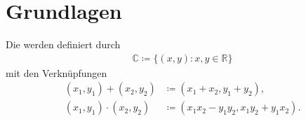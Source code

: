 %

\section{Grundlagen}
\addtocounter{thmn}{1}
\setcounter{theorem}{0}

\begin{theorem}[Definition]
  Die  werden definiert durch
  \begin{align*}
    \mathbb{C} \coloneq \{ (x,y) : x,y \in \mathbb{R} \}
  \end{align*}
  mit den Verknüpfungen
  \begin{align*}
    (x_1,y_1) + (x_2,y_2) &\coloneq (x_1 + x_2,y_1 + y_2), \\
    (x_1,y_1) \cdot (x_2,y_2) &\coloneq (x_1 x_2 - y_1 y_2, x_1 y_2 + y_1 x_2).
  \end{align*}
\end{theorem}

